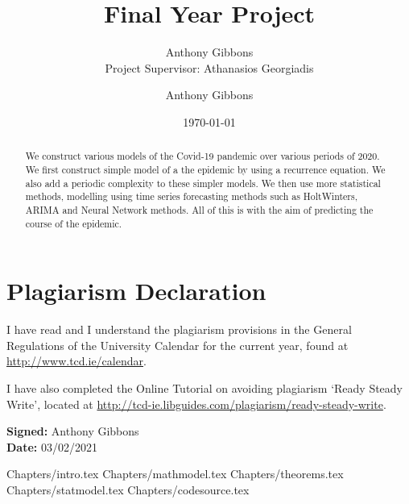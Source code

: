 \documentclass[a4paper]{article}
\title{Final Year Project}
\author{Anthony Gibbons \qquad 17322353 \\ Project Supervisor: Athanasios Georgiadis}
\author{Anthony Gibbons}
\date{\today}
\begin{document}
\maketitle      

\begin{abstract}
    We construct various models of the Covid-19 pandemic over various periods of 2020. We first construct simple model of a the epidemic by using a recurrence equation. We also add a periodic complexity to these simpler models. We then use more statistical methods, modelling using time series forecasting methods such as HoltWinters, ARIMA and Neural Network methods. All of this is with the aim of predicting the course of the epidemic.
\end{abstract}
\pagebreak
\section*{Plagiarism Declaration}
I have read and I understand the plagiarism provisions in the General
Regulations of the University Calendar for the current year, found at
\url{http://www.tcd.ie/calendar}.

I have also completed the Online Tutorial on avoiding plagiarism
‘Ready Steady Write’, located at
\url{http://tcd-ie.libguides.com/plagiarism/ready-steady-write}.

\textbf{Signed:} Anthony Gibbons \\
\textbf{Date:} 03/02/2021
\pagebreak

\hypersetup{
    linkcolor=black,
}

\tableofcontents \pagebreak

{Chapters/intro.tex}
\pagebreak
{Chapters/mathmodel.tex}
\pagebreak
{Chapters/theorems.tex}
\pagebreak
{Chapters/statmodel.tex}
\pagebreak
{Chapters/codesource.tex}
\pagebreak 
\printbibliography
\end{document}

